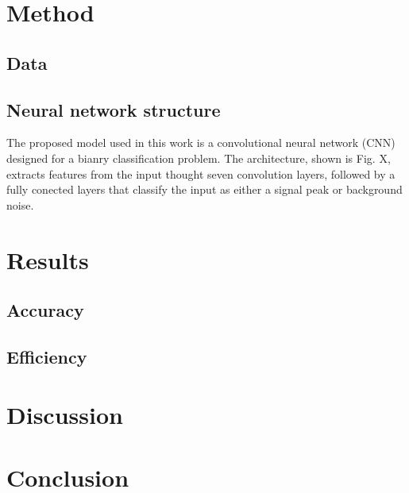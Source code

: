 \documentclass{article}
\begin{document}
\begin{multicols}{2}
\section{Method}
\subsection{Data}

\subsection{Neural network structure}

\indent
The proposed model used in this work is a convolutional neural network (CNN) designed for a bianry classification problem.
The architecture, shown is Fig. X, extracts features from the input thought seven convolution layers, 
followed by a fully conected layers that classify the input as either a signal peak or background noise.



\section{Results}
\subsection{Accuracy}

\subsection{Efficiency}


\section{Discussion}


\section{Conclusion}



\end{multicols}
\end{document}

